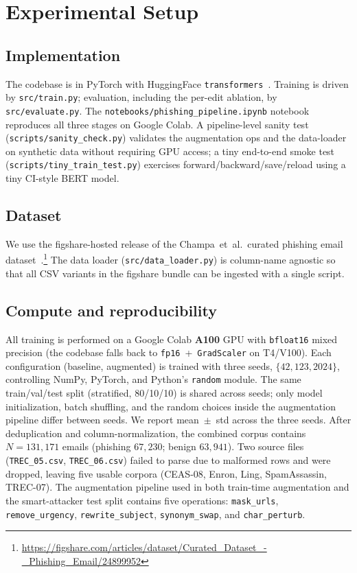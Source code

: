 \documentclass[conference]{IEEEtran}
\begin{document}
\section{Experimental Setup}
\label{sec:setup}

\subsection{Implementation}
The codebase is in PyTorch with HuggingFace
\texttt{transformers}~\cite{wolf2020transformers}. Training is driven by
\texttt{src/train.py}; evaluation, including the per-edit ablation, by
\texttt{src/evaluate.py}. The \texttt{notebooks/phishing\_pipeline.ipynb}
notebook reproduces all three stages on Google Colab. A pipeline-level
sanity test (\texttt{scripts/sanity\_check.py}) validates the augmentation
ops and the data-loader on synthetic data without requiring GPU access; a
tiny end-to-end smoke test (\texttt{scripts/tiny\_train\_test.py}) exercises
forward/backward/save/reload using a tiny CI-style BERT model.

\subsection{Dataset}
We use the figshare-hosted release of the Champa~et~al.\ curated phishing
email dataset~\cite{champa2024curated}.\footnote{\url{https://figshare.com/articles/dataset/Curated_Dataset_-_Phishing_Email/24899952}}
The data loader (\texttt{src/data\_loader.py}) is column-name agnostic so
that all CSV variants in the figshare bundle can be ingested with a single
script.

\subsection{Compute and reproducibility}
All training is performed on a Google Colab \textbf{A100} GPU with
\texttt{bfloat16} mixed precision (the codebase falls back to
\texttt{fp16}~+~\texttt{GradScaler} on T4/V100). Each configuration
(baseline, augmented) is trained with three seeds, $\{42, 123, 2024\}$,
controlling NumPy, PyTorch, and Python's \texttt{random} module. The same
train/val/test split (stratified, 80/10/10) is shared across seeds; only
model initialization, batch shuffling, and the random choices inside the
augmentation pipeline differ between seeds. We report mean~$\pm$~std
across the three seeds. After deduplication and column-normalization, the
combined corpus contains $N\!=\!131{,}171$ emails (phishing $67{,}230$;
benign $63{,}941$). Two source files
(\texttt{TREC\_05.csv}, \texttt{TREC\_06.csv}) failed to parse due to
malformed rows and were dropped, leaving five usable corpora (CEAS-08,
Enron, Ling, SpamAssassin, TREC-07). The augmentation pipeline used in
both train-time augmentation and the smart-attacker test split contains
five operations: \texttt{mask\_urls}, \texttt{remove\_urgency},
\texttt{rewrite\_subject}, \texttt{synonym\_swap}, and
\texttt{char\_perturb}.
\end{document}
